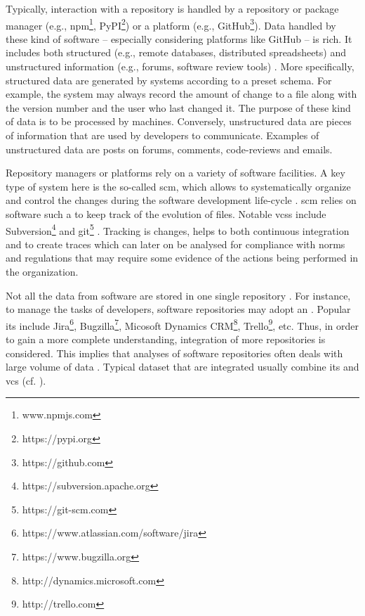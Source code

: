 Typically, interaction with a repository is handled by a repository or package manager (e.g., npm\footnote{www.npmjs.com}, PyPI\footnote{https://pypi.org}) or a platform (e.g., GitHub\footnote{https://github.com}). 
Data handled by these kind of software – especially considering platforms like GitHub – is rich. It includes both structured (e.g., remote databases, distributed spreadsheets) and unstructured information (e.g., forums, software review tools) \citep{DBLP:books/el/16/Bacchelli16,DBLP:conf/wcre/Bavota16}. More specifically,  structured data are generated by systems according to a preset schema. For example, the system may always record the amount of change to a file along with the version number and the user who last changed it. The purpose of these kind of data is to be processed by machines. Conversely, unstructured data are pieces of information that are used by developers to communicate. Examples of unstructured data are posts on forums, comments, code-reviews and emails. 

Repository managers or platforms rely on a variety of software facilities. A key type of system here is the so-called \gls{scm}, which allows to systematically organize and control the changes during the software development life-cycle \citep{DBLP:conf/icse/Estublier00}. \Gls{scm} relies on software such a  to keep track of the evolution of files. Notable \glspl{vcs} include Subversion\footnote{https://subversion.apache.org} and git\footnote{https://git-scm.com} \citep{torvalds2010git}. Tracking is changes, helps to both continuous integration and to create traces which can later on be analysed for compliance with norms and regulations that may require some evidence of the actions being performed in the organization.

Not all the data from software are stored in one single repository \citep{DBLP:journals/ese/KalliamvakouGBS16}. For instance, to manage the tasks of developers, software repositories may adopt an    \citep{DBLP:conf/cscw/BertramVGW10}. Popular \gls{its} include Jira\footnote{https://www.atlassian.com/software/jira}, Bugzilla\footnote{https://www.bugzilla.org}, Micosoft Dynamics CRM\footnote{http://dynamics.microsoft.com}, Trello\footnote{http://trello.com}, etc.  Thus, in order to gain a more complete understanding, integration of more repositories is considered. This implies that analyses of software repositories often deals with large volume of data \citep{DBLP:journals/tosem/0001NRN15,DBLP:journals/jossw/Boettiger18,DBLP:conf/wcre/BoldiPVZ20}. Typical dataset that are integrated usually combine \gls{its} and \gls{vcs} (cf. ).  

